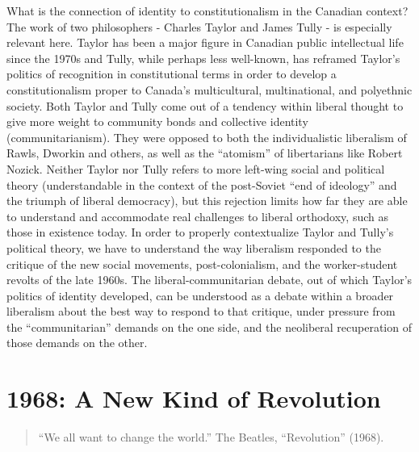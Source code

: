 \documentclass[12pt,oneside]{memoir}
\begin{document}
What is the connection of identity to constitutionalism in the Canadian context? The work of two philosophers - Charles Taylor and James Tully - is especially relevant here. Taylor has been a major figure in Canadian public intellectual life since the 1970s and Tully, while perhaps less well-known, has reframed Taylor's politics of recognition in constitutional terms in order to develop a constitutionalism proper to Canada's multicultural, multinational, and polyethnic society. Both Taylor and Tully come out of a tendency within liberal thought to give more weight to community bonds and collective identity (communitarianism). They were opposed to both the individualistic liberalism of Rawls, Dworkin and others, as well as the ``atomism'' \citep{Taylor1985} of libertarians like Robert Nozick. Neither Taylor nor Tully refers to more left-wing social and political theory (understandable in the context of the post-Soviet ``end of ideology'' and the triumph of liberal democracy), but this rejection limits how far they are able to understand and accommodate real challenges to liberal orthodoxy, such as those in existence today.
In order to properly contextualize Taylor and Tully's political theory, we have to understand the way liberalism responded to the critique of the new social movements, post-colonialism, and the worker-student revolts of the late 1960s. The liberal-communitarian debate, out of which Taylor's politics of identity developed, can be understood as a debate within a broader liberalism about the best way to respond to that critique, under pressure from the ``communitarian'' demands on the one side, and the neoliberal recuperation of those demands on the other.

\section*{1968: A New Kind of Revolution}

\begin{quote}
``We all want to change the world.'' The Beatles, ``Revolution'' (1968).
\end{quote}
\end{document}
